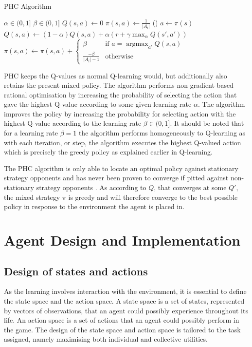 \begin{algorithm}
\caption{PHC Algorithm}
\label{phc-algorithm}
$\alpha\in(0,1]$
$\beta\in(0,1]$
$Q(s,a)\leftarrow0$\;
$\pi(s,a)\leftarrow\frac{1}{\left|A_i\right|}$\;
\Begin(){
	$a\gets\pi(s)$\;
	$Q(s,a)\leftarrow (1-\alpha)Q(s,a)+\alpha\left(r+\gamma\max_{\alpha}Q\left(s',a'\right)\right)$\;
	$ \pi(s,a)\leftarrow\pi(s,a)+\begin{cases}
            \beta &\textrm{if } a=\operatorname{argmax}_{a'}Q(s,a)\\
            \frac{-\beta}{|A_i|-1} &\textrm{otherwise}
            \end{cases}$\;
}
\end{algorithm}

PHC keeps the Q-values as normal Q-learning would, but additionally also retains the present mixed policy. The algorithm performs non-gradient based rational optimisation by increasing the probability of selecting the action that gave the highest Q-value according to some given learning rate $\alpha$. The algorithm improves the policy by increasing the probability for selecting action with the highest Q-value according to the learning rate $\beta\in(0,1]$. It should be noted that for a learning rate $\beta=1$ the algorithm performs homogeneously to Q-learning as with each iteration, or step, the algorithm executes the highest Q-valued action which is precisely the greedy policy as explained earlier in Q-learning.

The PHC algorithm is only able to locate an optimal policy against stationary strategy opponents and has never been proven to converge if pitted against non-stationary strategy opponents \cite{BowlingMichael2002Mlua}. As according to $Q$, that converges at some $Q'$, the mixed strategy $\pi$ is greedy and will therefore converge to the best possible policy in response to the environment the agent is placed in. 

\section{Agent Design and Implementation}
\subsection{Design of states and actions}
As the learning involves interaction with the environment, it is essential to define the state space and the action space. A state space is a set of states, represented by vectors of observations, that an agent could possibly experience throughout its life. An action space is a set of actions that an agent could possibly perform in the game. The design of the state space and action space is tailored to the task assigned, namely maximising both individual and collective utilities. 
